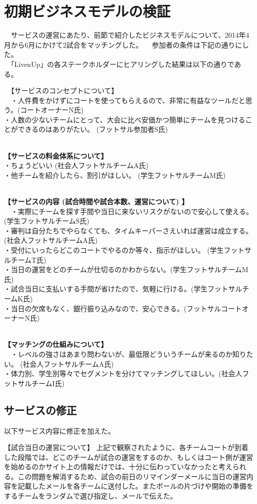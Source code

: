 \section{初期ビジネスモデルの検証}
　サービスの運営にあたり、前節で紹介したビジネスモデルについて、2014年4月から6月にかけて2試合をマッチングした。
　参加者の条件は下記の通りにした。
　\\　「LivenUp」の各ステークホルダーにヒアリングした結果は以下の通りである。
　\par
　【サービスのコンセプトについて】
　\\　・人件費をかけずにコートを使ってもらえるので、非常に有益なツールだと思う。(コートオーナーN氏)
　\\・人数の少ないチームにとって、大会に比べ安価かつ簡単にチームを見つけることができるのはありがたい。 (フットサル参加者S氏)
　\par
　\\\textbf{【サービスの料金体系について】}
　\\・ちょうどいい (社会人フットサルチームA氏)
　\\・他チームを紹介したら、割引がほしい。 (学生フットサルチームM氏)
　\par
　\\\textbf{【サービスの内容 (試合時間や試合本数、運営について) 】}
\\　・実際にチームを探す手間や当日に来ないリスクがないので安心して使える。 (学生フットサルチームS氏)
　\\・審判は自分たちでやらなくても、タイムキーパーさえいれば運営は成立する。 (社会人フットサルチームA氏)
　\\・受付にいったらどこのコートでやるのか等々、指示がほしい。 (学生フットサルチームT氏)
　\\・当日の運営をどのチームが仕切るのかわからない。(学生フットサルチームM氏)
　\\・試合当日に支払いする手間が省けたので、気軽に行ける。(学生フットサルチームK氏)
　\\・当日の欠席もなく、銀行振り込みなので、安心できる。(フットサルコートオーナーN氏)
　\par
　\\\textbf{【マッチングの仕組みについて】}
\\　・レベルの強さはあまり問わないが、最低限どういうチームが来るのか知りたい。 (社会人フットサルチームA氏)
　\\・体力別、学生別等々でセグメントを分けてマッチングしてほしい。(社会人フットサルチームI氏)


\subsection{サービスの修正}
以下サービス内容に修正を加えた。

【試合当日の運営について】
上記で観察されたように、各チームコートが到着した段階では、どこのチームが試合の運営をするのか、もしくはコート側が運営を始めるのかサイト上の情報だけでは、十分に伝わっていなかったと考えられる。この問題を解消するため、試合の前日のリマインダーメールに当日の運営内容を記載したメールを各チームに送付した。またボールの片づけや開始の準備をするチームをランダムで選び指定し、メールで伝えた。








